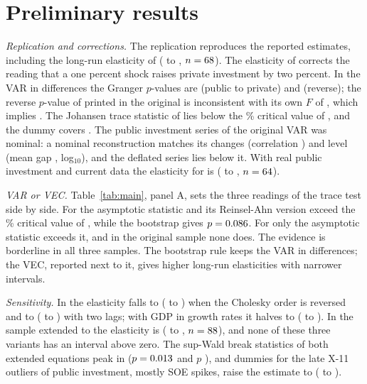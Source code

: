 \documentclass[11pt,a4paper]{article}
\begin{document}
\section{Preliminary results}

\textit{Replication and corrections.} The replication reproduces the reported estimates, including the long-run elasticity of \ElastRep{} (\ElastRepLo{} to \ElastRepHi{}, $n = 68$). The elasticity of \ElastRep{} corrects the reading that a one percent shock raises private investment by two percent. In the VAR in differences the Granger $p$-values are \pGrangerRep{} (public to private) and \pGrangerRevRep{} (reverse); the reverse $p$-value of \pGrangerTextRev{} printed in the original is inconsistent with its own $F$ of \FGrangerTextRev{}, which implies \pGrangerImplied. The Johansen trace statistic of \JohTextTrace{} lies below the \SigLevel\% critical value of \JohTextCV{}, and the dummy covers \DumDates{}. The public investment series of the original VAR was nominal: a nominal reconstruction matches its changes (correlation \CorrNominal) and level (mean gap \DevNominal{}, log$_{10}$), and the deflated series lies \DevReal{} below it. With real public investment and current data the elasticity for \SampleCorr{} is \ElastCorr{} (\ElastCorrLo{} to \ElastCorrHi{}, $n = 64$).

\textit{VAR or VEC.} Table~\ref{tab:main}, panel A, sets the three readings of the trace test side by side. For \SampleCorr{} the asymptotic statistic and its Reinsel-Ahn version exceed the \SigLevel\% critical value of \JohCV{}, while the bootstrap gives $p = 0.086$. For \SampleExt{} only the asymptotic statistic exceeds it, and in the original sample none does. The evidence is borderline in all three samples. The bootstrap rule keeps the VAR in differences; the VEC, reported next to it, gives higher long-run elasticities with narrower intervals.

\textit{Sensitivity.} In \SampleCorr{} the elasticity falls to \ElastCholCorr{} (\ElastCholCorrLo{} to \ElastCholCorrHi{}) when the Cholesky order is reversed and to \ElastPtwoCorr{} (\ElastPtwoCorrLo{} to \ElastPtwoCorrHi{}) with two lags; with GDP in growth rates it halves to \ElastGdpCorr{} (\ElastGdpCorrLo{} to \ElastGdpCorrHi{}). In the sample extended to \SampleEndYear{} the elasticity is \ElastExt{} (\ElastExtLo{} to \ElastExtHi{}, $n = 88$), and none of these three variants has an interval above zero. The sup-Wald break statistics of both extended equations peak in \SupFDate{} ($p = 0.013$ and $p$ \SupFpFbcf), and dummies for the late X-11 outliers of public investment, mostly SOE spikes, raise the estimate to \ElastDumA{} (\ElastDumALo{} to \ElastDumAHi{}).
\end{document}
